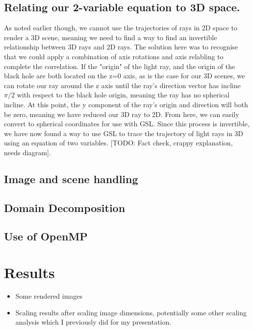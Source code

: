 \subsection {Relating our 2-variable equation to 3D space.}
As noted earlier though, we cannot use the trajectories of rays in 2D space to render a 3D scene, meaning we need to find a way to find an invertible relationship between 3D rays and 2D rays. The solution here was to recognise that we could apply a combination of axis rotations and axis relabling to complete the correlation. If the "origin" of the light ray, and the origin of the black hole are both located on the z=0 axis, as is the case for our 3D scenes, we can rotate our ray around the z axis until the ray's direction vector has incline $ \pi / 2 $ with respect to the black hole origin, meaning the ray has no spherical incline. At this point, the y component of the ray's origin and direction will both be zero, meaning we have reduced our 3D ray to 2D. From here, we can easily convert to spherical coordinates for use with GSL. Since this process is invertible, we have now found a way to use GSL to trace the trajectory of light rays in 3D using an equation of two variables. [TODO: Fact check, crappy explanation, needs diagram].

\subsection {Image and scene handling}
\subsection {Domain Decomposition}
\subsection {Use of OpenMP}


\section{Results}
\label{sec:results}

\begin{itemize}
	\item Some rendered images
    	\item Scaling results after scaling image dimensions, potentially some other scaling analysis 
      which I previously did for my presentation.
\end{itemize}


